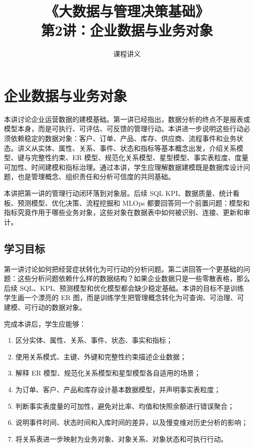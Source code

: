 \documentclass[UTF8,fontset=fandol,openany,zihao=-4]{ctexbook}
\title{《大数据与管理决策基础》\\[0.5em]\large 第2讲：企业数据与业务对象}
\author{课程讲义}
\date{}
\begin{document}
\maketitle
\tableofcontents

\setcounter{chapter}{1}
\chapter{企业数据与业务对象}
\label{ch:week02-enterprise-data-model}

\begin{chapterbox}
本讲讨论企业运营数据的建模基础。第一讲已经指出，数据分析的终点不是报表或模型本身，而是可执行、可评估、可反馈的管理行动。本讲进一步说明这些行动必须依赖稳定的数据对象：客户、订单、产品、库存、供应商、流程事件和业务状态。讲义从实体、属性、关系、事件、状态和指标等基本概念出发，介绍关系模型、键与完整性约束、ER 模型、规范化关系模型、星型模型、事实表粒度、度量可加性、时间建模和指标治理。通过本讲，学生应理解数据建模既是数据库设计问题，也是管理概念、组织责任和分析可信度的共同基础。
\end{chapterbox}

\begin{modernbox}[课程接口]
本讲把第一讲的管理行动闭环落到对象层。后续 SQL KPI、数据质量、统计看板、预测模型、优化决策、流程挖掘和 MLOps 都要回答同一个前置问题：模型和指标究竟作用于哪些业务对象，这些对象在数据表中如何被识别、连接、更新和审计。
\end{modernbox}

\section{学习目标}

第一讲讨论如何把经营症状转化为可行动的分析问题。第二讲回答一个更基础的问题：这些分析问题依赖什么样的数据结构？如果企业数据只是一些零散表格，那么后续 SQL、KPI、预测模型和优化模型都会缺少稳定基础。本讲的目标不是训练学生画一个漂亮的 ER 图，而是训练学生把管理概念转化为可查询、可治理、可建模、可行动的数据对象。

完成本讲后，学生应能够：
\begin{enumerate}
  \item 区分实体、属性、关系、事件、状态、事实和指标；
  \item 使用关系模式、主键、外键和完整性约束描述企业数据；
  \item 解释 ER 模型、规范化关系模型和星型模型各自适用的场景；
  \item 为订单、客户、产品和库存设计基本数据模型，并声明事实表粒度；
  \item 判断事实表度量的可加性，避免对比率、均值和快照余额进行错误聚合；
  \item 说明事件时间、状态时间和入库时间的差异，以及慢变维对历史分析的影响；
  \item 将关系表进一步映射为业务对象、对象关系、对象状态和可执行行动。
\end{enumerate}
\end{document}
